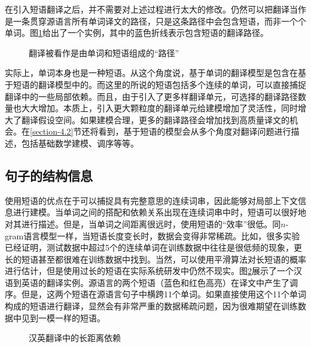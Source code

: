 \parinterval 在引入短语翻译之后，并不需要对上述过程进行太大的修改。仍然可以把翻译当作是一条贯穿源语言所有单词译文的路径，只是这条路径中会包含短语，而非一个个单词。图\ref{fig:4-5}给出了一个实例，其中的蓝色折线表示包含短语的翻译路径。

\begin{figure}[htp]
\centering

\caption{翻译被看作是由单词和短语组成的``路径''}
\label{fig:4-5}
\end{figure}

\parinterval 实际上，单词本身也是一种短语。从这个角度说，基于单词的翻译模型是包含在基于短语的翻译模型中的。而这里的所说的短语包括多个连续的单词，可以直接捕捉翻译中的一些局部依赖。而且，由于引入了更多样翻译单元，可选择的翻译路径数量也大大增加。本质上，引入更大颗粒度的翻译单元给建模增加了灵活性，同时增大了翻译假设空间。如果建模合理，更多的翻译路径会增加找到高质量译文的机会。在\ref{section-4.2}节还将看到，基于短语的模型会从多个角度对翻译问题进行描述，包括基础数学建模、调序等等。


\subsection{句子的结构信息}

\parinterval 使用短语的优点在于可以捕捉具有完整意思的连续词串，因此能够对局部上下文信息进行建模。当单词之间的搭配和依赖关系出现在连续词串中时，短语可以很好地对其进行描述。但是，当单词之间距离很远时，使用短语的``效率''很低。同$n$-gram语言模型一样，当短语长度变长时，数据会变得非常稀疏。比如，很多实验已经证明，测试数据中超过5个的连续单词在训练数据中往往是很低频的现象，更长的短语甚至都很难在训练数据中找到。当然，可以使用平滑算法对长短语的概率进行估计，但是使用过长的短语在实际系统研发中仍然不现实。图\ref{fig:4-6}展示了一个汉语到英语的翻译实例。源语言的两个短语（蓝色和红色高亮）在译文中产生了调序。但是，这两个短语在源语言句子中横跨11个单词。如果直接使用这个11个单词构成的短语进行翻译，显然会有非常严重的数据稀疏问题，因为很难期望在训练数据中见到一模一样的短语。

\begin{figure}[htp]
\centering

\caption{汉英翻译中的长距离依赖}
\label{fig:4-6}
\end{figure}

